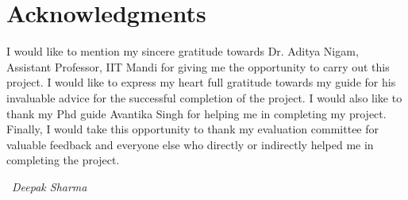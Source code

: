 \chapter*{Acknowledgments}

I would like to mention my sincere gratitude towards Dr. Aditya Nigam, Assistant Professor, IIT Mandi for giving me the opportunity to carry out this project.
I would like to express my heart full gratitude towards my guide for his
invaluable advice for the successful completion of the project.
I would also like to thank my Phd guide Avantika Singh for helping me in completing my project.
Finally, I would take this opportunity to thank my evaluation committee for valuable feedback and everyone else who directly or indirectly helped me in completing the project.

~\hfill{\it Deepak Sharma}

\clearpage 
